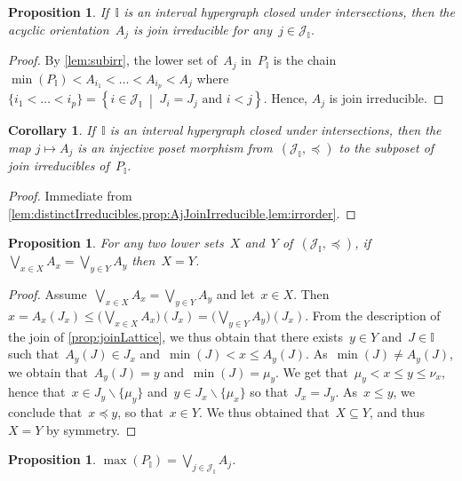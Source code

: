 \documentclass{amsart}
\newtheorem{corollary}[theorem]{Corollary}
\newtheorem{proposition}[theorem]{Proposition}
\theoremstyle{definition}
\newcommand{\cal}[1]{\mathcal{#1}} %
\newcommand{\set}[2]{\left\{ #1 \;\middle|\; #2 \right\}} %
\newcommand{\ssm}{\smallsetminus} %
\newcommand{\bigJoin}{\bigvee} %
\newcommand{\II}{\mathbb I} %
\newcommand{\cJ}{\cal{J}} %
\begin{document}
\begin{proposition}
\label{prop:AjJoinIrreducible}
If~$\II$ is an interval hypergraph closed under intersections, then the acyclic orientation~$A_j$ is join irreducible for any~$j\in \cJ_\II$.
\end{proposition}

\begin{proof}
By \cref{lem:subirr}, the lower set of~$A_j$ in~$P_\II$ is the chain $\min(P_\II) < A_{i_1} < \dots < A_{i_p} < A_j$ where~$\{i_1 < \dots < i_p\} = \set{i \in \cJ_\II}{J_i = J_j \text{ and } i < j}$.
Hence, $A_j$ is join irreducible.
\end{proof}

\begin{corollary}
\label{coro:irreduciblePosetMorphism}
If~$\II$ is an interval hypergraph closed under intersections, then the map $j \mapsto A_j$ is an injective poset morphism from~$(\cJ_\II, \preccurlyeq)$ to the subposet of join irreducibles of~$P_\II$.
\end{corollary}

\begin{proof}
Immediate from \cref{lem:distinctIrreducibles,prop:AjJoinIrreducible,lem:irrorder}.
\end{proof}

\begin{proposition}
\label{prop:injectivityDistributive}
For any two lower sets~$X$ and~$Y$ of~$(\cJ_\II, \preccurlyeq)$, if~$\bigJoin\limits_{x \in X} A_x = \bigJoin\limits_{y \in Y} A_y$ then~$X = Y$.
\end{proposition}

\begin{proof}
Assume~$\bigJoin\limits_{x \in X} A_x = \bigJoin\limits_{y \in Y} A_y$ and let~$x \in X$.
Then $x = A_x(J_x) \le \big( \bigJoin\limits_{x \in X} A_x \big)(J_x) = \big( \bigJoin\limits_{y \in Y} A_y \big)(J_x)$.
From the description of the join of \cref{prop:joinLattice}, we thus obtain that there exists~$y \in Y$ and~$J \in \II$ such that~$A_y(J) \in J_x$ and~$\min(J) < x \le A_y(J)$.
As~$\min(J) \ne A_y(J)$, we obtain that~$A_y(J) = y$ and~$\min(J) = \mu_y$.
We get that~$\mu_y < x \le y \le \nu_x$, hence that~$x \in J_y \ssm \{\mu_y\}$ and~$y \in J_x \ssm \{\mu_x\}$ so that~$J_x = J_y$.
As~$x \le y$, we conclude that~$x \preccurlyeq y$, so that~$x \in Y$.
We thus obtained that~$X \subseteq Y$, and thus~$X = Y$ by symmetry.
\end{proof}

\begin{proposition}
$\displaystyle \max(P_\II) = \bigJoin\limits_{j \in \cJ_\II} A_j$.
\end{proposition}
\end{document}
